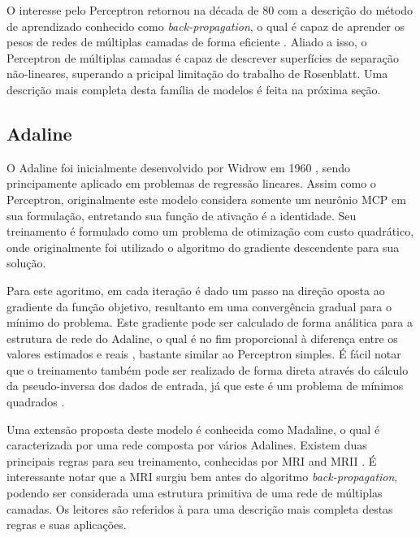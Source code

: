 \documentclass[conference]{IEEEtran}
\begin{document}
	O interesse pelo Perceptron retornou na década de 80 com a descrição do método de aprendizado conhecido como \textit{back-propagation}, o qual é capaz de aprender os pesos de redes de múltiplas camadas de forma eficiente \cite{rumelhart1985learning}. Aliado a isso, o Perceptron de múltiplas camadas é capaz de descrever superfícies de separação não-lineares, superando a pricipal limitação do trabalho de Rosenblatt. Uma descrição mais completa desta família de modelos é feita na próxima seção.

	\subsection{Adaline}
	O Adaline foi inicialmente desenvolvido por Widrow em 1960 \cite{widrow1960adaptive}, sendo principamente aplicado em problemas de regressão lineares. Assim como o Perceptron, originalmente este modelo considera somente um neurônio MCP em sua formulação, entretando sua função de ativação é a identidade. Seu treinamento é formulado como um problema de otimização com custo quadrático, onde originalmente foi utilizado o algoritmo do gradiente descendente para sua solução. 
	
	Para este agoritmo, em cada iteração é dado um passo na direção oposta ao gradiente da função objetivo, resultanto em uma convergência gradual para o mínimo do problema. Este gradiente pode ser calculado de forma análitica para a estrutura de rede do Adaline, o qual é no fim proporcional à diferença entre os valores estimados e reais \cite{widrow1960adaptive}, bastante similar ao Perceptron simples. É fácil notar que o treinamento também pode ser realizado de forma direta através do cálculo da  pseudo-inversa dos dados de entrada, já que este é um problema de mínimos quadrados \cite{haykin2007neural}.
	
	Uma extensão proposta deste modelo é conhecida como Madaline, o qual é caracterizada por uma rede composta por vários Adalines. Existem duas principais regras para seu treinamento, conhecidas por MRI \cite{widrow1962generalization} and MRII \cite{winter1988madaline}. É interessante notar que a MRI surgiu bem antes do algoritmo \textit{back-propagation}, podendo ser considerada uma estrutura primitiva de uma rede de múltiplas camadas. Os leitores são referidos à \cite{widrow199030} para uma descrição mais completa destas regras e suas aplicações.
	
	   
	
	 
	
	
\end{document}
